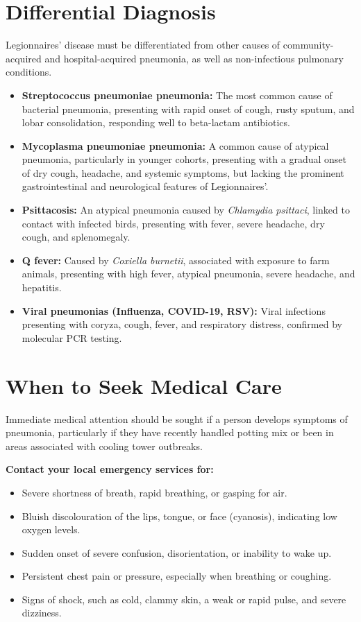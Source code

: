 \section*{Differential Diagnosis}
Legionnaires' disease must be differentiated from other causes of community-acquired and hospital-acquired pneumonia, as well as non-infectious pulmonary conditions.

\begin{itemize}
    \item \textbf{Streptococcus pneumoniae pneumonia:} The most common cause of bacterial pneumonia, presenting with rapid onset of cough, rusty sputum, and lobar consolidation, responding well to beta-lactam antibiotics.
    \item \textbf{Mycoplasma pneumoniae pneumonia:} A common cause of atypical pneumonia, particularly in younger cohorts, presenting with a gradual onset of dry cough, headache, and systemic symptoms, but lacking the prominent gastrointestinal and neurological features of Legionnaires'.
    \item \textbf{Psittacosis:} An atypical pneumonia caused by \textit{Chlamydia psittaci}, linked to contact with infected birds, presenting with fever, severe headache, dry cough, and splenomegaly.
    \item \textbf{Q fever:} Caused by \textit{Coxiella burnetii}, associated with exposure to farm animals, presenting with high fever, atypical pneumonia, severe headache, and hepatitis.
    \item \textbf{Viral pneumonias (Influenza, COVID-19, RSV):} Viral infections presenting with coryza, cough, fever, and respiratory distress, confirmed by molecular PCR testing.
\end{itemize}

\section*{When to Seek Medical Care}
Immediate medical attention should be sought if a person develops symptoms of pneumonia, particularly if they have recently handled potting mix or been in areas associated with cooling tower outbreaks.

\textbf{Contact your local emergency services for:}
\begin{itemize}
    \item Severe shortness of breath, rapid breathing, or gasping for air.
    \item Bluish discolouration of the lips, tongue, or face (cyanosis), indicating low oxygen levels.
    \item Sudden onset of severe confusion, disorientation, or inability to wake up.
    \item Persistent chest pain or pressure, especially when breathing or coughing.
    \item Signs of shock, such as cold, clammy skin, a weak or rapid pulse, and severe dizziness.
\end{itemize}

